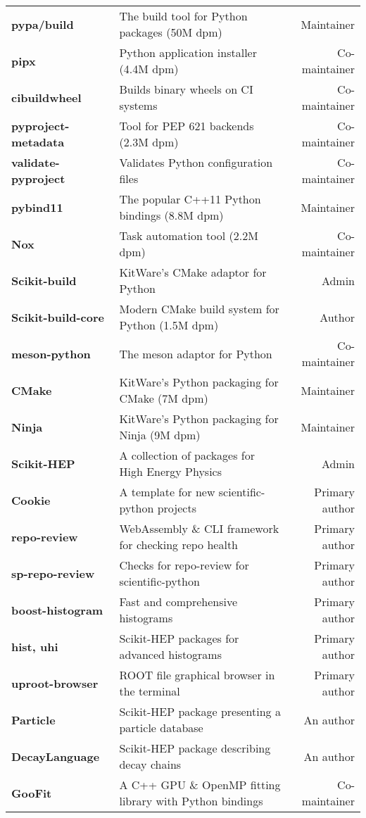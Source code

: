 \documentclass[10pt,letterpaper]{moderncv}
\begin{document}
\begin{tabularx}{\textwidth}{>{\bfseries}p{1.2in}Xr}
    pypa/build & The build tool for Python packages (50M dpm) & Maintainer \\
    pipx & Python application installer (4.4M dpm) & Co-maintainer \\
    cibuildwheel & Builds binary wheels on CI systems & Co-maintainer \\
    pyproject-metadata & Tool for PEP 621 backends (2.3M dpm) & Co-maintainer \\
    validate-pyproject & Validates Python configuration files & Co-maintainer \\
    pybind11 & The popular C++11 Python bindings (8.8M dpm) & Maintainer \\
    Nox & Task automation tool (2.2M dpm) & Co-maintainer \\
    Scikit-build & KitWare's CMake adaptor for Python & Admin \\
    Scikit-build-core & Modern CMake build system for Python (1.5M dpm) & Author \\
    meson-python & The meson adaptor for Python & Co-maintainer \\
    CMake & KitWare's Python packaging for CMake (7M dpm) & Maintainer \\
    Ninja & KitWare's Python packaging for Ninja (9M dpm) & Maintainer \\
    Scikit-HEP & A collection of packages for High Energy Physics & Admin \\
    Cookie & A template for new scientific-python projects & Primary author \\
    repo-review & WebAssembly \& CLI framework for checking repo health & Primary author \\
    sp-repo-review & Checks for repo-review for scientific-python & Primary author \\
    boost-histogram & Fast and comprehensive histograms & Primary author \\
    hist, uhi & Scikit-HEP packages for advanced histograms & Primary author \\
    uproot-browser & ROOT file graphical browser in the terminal & Primary author \\
	Particle & Scikit-HEP package presenting a particle database & An author \\
	DecayLanguage & Scikit-HEP package describing decay chains & An author \\
    GooFit & A C++ GPU \& OpenMP fitting library with Python bindings & Co-maintainer \\

\end{tabularx}
\end{document}
